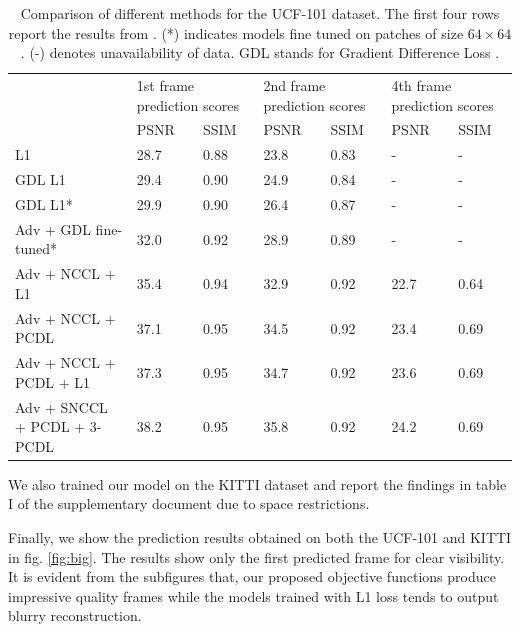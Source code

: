 \documentclass{article}
\begin{document}
  \begin{table}[!htbp]
  	\centering
  	\caption{Comparison of different methods for the UCF-101 dataset. The first four rows report the results from \cite{mathieu2015deep}. (*) indicates models fine tuned on patches of size $ 64 \times 64 $ \cite{mathieu2015deep}. (-) denotes unavailability of data. GDL stands for Gradient Difference Loss \cite{mathieu2015deep}.}
  	\begin{tabular}{p{4cm}p{1cm}p{1cm}p{1cm}p{1cm}p{1cm}p{1cm}}
  		\hline
  		\multirow{2}{*}{} &
  		\multicolumn{2}{p{2.5cm}}{1st frame prediction scores} &
  		\multicolumn{2}{p{2.5cm}}{2nd frame prediction scores} &
  		\multicolumn{2}{p{2.5cm}}{4th frame prediction scores} \\
  		Methods & PSNR & SSIM & PSNR & SSIM & PSNR & SSIM \\
  		\hline
  		L1 & 28.7 & 0.88 & 23.8 & 0.83 & - & - \\
  		\hline
  		GDL L1 & 29.4 & 0.90 & 24.9 & 0.84 & - & - \\
  		\hline
  		GDL L1* & 29.9 & 0.90 & 26.4 & 0.87 & - & - \\
  		\hline
  		Adv + GDL fine-tuned* & 32.0 & 0.92 & 28.9 & 0.89 & - & - \\
  		\hline
  		Adv + NCCL + L1 & 35.4 & 0.94 & 32.9 & 0.92 & 22.7 & 0.64 \\
  		\hline
  		Adv + NCCL + PCDL & 37.1 & 0.95 & 34.5 & 0.92 & 23.4 & 0.69 \\
  		\hline
  		Adv + NCCL + PCDL + L1 & 37.3 & 0.95 & 34.7 & 0.92 & 23.6 & 0.69 \\
  		\hline
  		Adv + SNCCL + PCDL + 3-PCDL & 38.2 & 0.95 & 35.8 & 0.92 & 24.2 & 0.69 \\
  		\hline
  	\end{tabular}
  	\label{tab:ucf}
  \end{table}
   
   We also trained our model on the KITTI dataset and report the findings in table I of the supplementary document due to space restrictions.
   
   Finally, we show the prediction results obtained on both the UCF-101 and KITTI in fig. \ref{fig:big}. The results show only the first predicted frame for clear visibility. It is evident from the subfigures that, our proposed objective functions produce impressive quality frames while the models trained with L1 loss tends to output blurry reconstruction.
   
   
   
\end{document}
